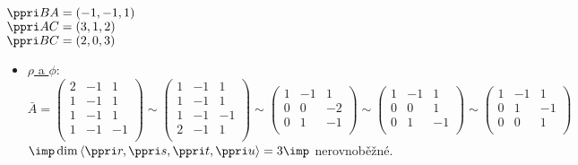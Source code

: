  $ \ve{BA} = (-1,-1,1)$ \\
 $ \ve{AC} = (3,1,2)$ \\
 $ \ve{BC} = (2,0,3)$ \\
\begin{itemize}
	\item \underline{$\rho$ a $\phi$}: \\
		 $ \bar{A} = \begin{pmatrix}
			 2 &-1 & 1 \\ 
			 1 &-1 & 1 \\ 
			 1 &-1 & 1 \\ 
			 1 &-1 & -1 \\ 
		 \end{pmatrix}
		 \sim
		 \begin{pmatrix}
			 1 &-1 & 1 \\ 
			 1 &-1 & 1 \\ 
			 1 &-1 & -1 \\ 
			 2 &-1 & 1 \\ 
		 \end{pmatrix}
		 \sim
		 \begin{pmatrix}
			 1 &-1 & 1 \\ 
			 0 &0 & -2 \\ 
			 0 &1 & -1 \\ 
		 \end{pmatrix}
		 \sim
		 \begin{pmatrix}
			 1 &-1 & 1 \\ 
			 0 &0 & 1 \\ 
			 0 &1 & -1 \\ 
		 \end{pmatrix}
		 \sim
		 \begin{pmatrix}
			 1 &-1 & 1 \\ 
			 0 &1 & -1 \\ 
			 0 &0 & 1 \\ 
		 \end{pmatrix}
		  $ \\
		  $\imp \dim\<\ve r, \ve s,\ve t,\ve u\> = 3 \imp $ nerovnoběžné.


\end{itemize}
